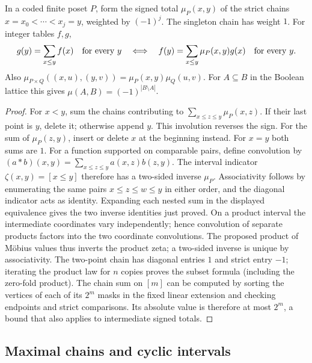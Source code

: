 \begin{theorem}\label{result39}
In a coded finite poset \(P\), form the signed total \(\mu_P(x,y)\)
of the strict chains \(x=x_0<\cdots<x_j=y\), weighted by \((-1)^j\).
The singleton chain has weight \(1\). For integer tables \(f,g\),
\[
 g(y)=\sum_{x\le y} f(x)\quad\hbox{for every }y
 \quad\Longleftrightarrow\quad
 f(y)=\sum_{x\le y}\mu_P(x,y)g(x)\quad\hbox{for every }y.
\]
Also \(\mu_{P\times Q}((x,u),(y,v))=\mu_P(x,y)\mu_Q(u,v)\).
For \(A\subseteq B\) in the Boolean lattice this gives
\(\mu(A,B)=(-1)^{|B\setminus A|}\).
\end{theorem}
\begin{proof}
For \(x<y\), sum the chains contributing to
\(\sum_{x\le z\le y}\mu_P(x,z)\). If their last point is \(y\), delete
it; otherwise append \(y\). This involution reverses the sign. For the
sum of \(\mu_P(z,y)\), insert or delete \(x\) at the beginning instead.
For \(x=y\) both sums are \(1\). For a function supported on comparable
pairs, define convolution by
\((a*b)(x,y)=\sum_{x\le z\le y}a(x,z)b(z,y)\).
The interval indicator \(\zeta(x,y)=[x\le y]\) therefore has a two-sided
inverse \(\mu_P\). Associativity follows by enumerating the same pairs
\(x\le z\le w\le y\) in either order, and the diagonal indicator acts
as identity. Expanding each nested sum in the displayed equivalence
gives the two inverse identities just proved.
On a product interval the intermediate coordinates vary independently;
hence convolution of separate products factors into the two coordinate
convolutions. The proposed product of M\"obius values thus inverts the
product zeta; a two-sided inverse is unique by associativity.
The two-point chain has diagonal entries \(1\) and strict entry \(-1\);
iterating the product law for \(n\) copies proves the subset formula
(including the zero-fold product). The chain sum on \([m]\) can be computed
by sorting the vertices of each of its \(2^m\) masks in the fixed linear
extension and checking endpoints and strict comparisons. Its absolute
value is therefore at most \(2^m\), a bound that also applies to
intermediate signed totals.
\end{proof}

\subsection{Maximal chains and cyclic intervals}

